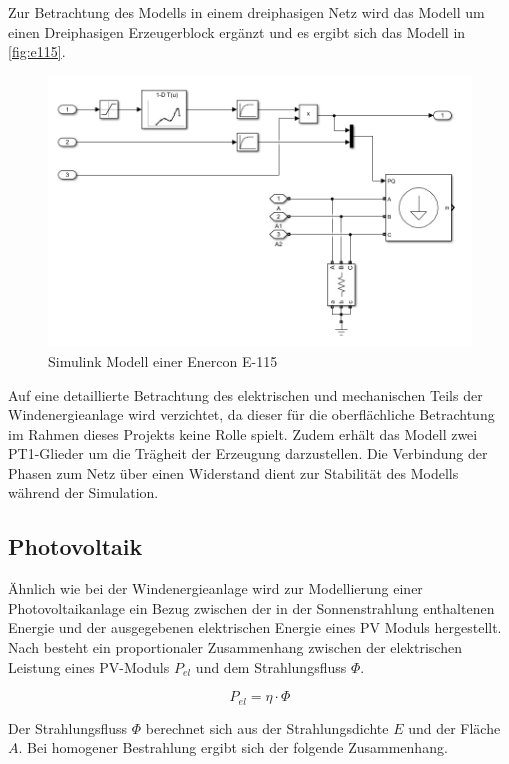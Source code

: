 Zur Betrachtung des Modells in einem dreiphasigen Netz wird das Modell um einen Dreiphasigen Erzeugerblock ergänzt und es ergibt sich das Modell in \autoref{fig:e115}. 

\begin{figure}[H]
	\centering
	\includegraphics[width=0.9\linewidth]{Abbildungen/ModellWEA.png}
	\caption{Simulink Modell einer Enercon E-115}
	\label{fig:e115}
\end{figure}

Auf eine detaillierte Betrachtung des elektrischen und mechanischen Teils der Windenergieanlage wird verzichtet, da dieser für die oberflächliche Betrachtung im Rahmen dieses Projekts keine Rolle spielt. Zudem erhält das Modell zwei PT1-Glieder um die Trägheit der Erzeugung darzustellen. Die Verbindung der Phasen zum Netz über einen Widerstand dient zur Stabilität des Modells während der Simulation.

\subsection{Photovoltaik}

Ähnlich wie bei der Windenergieanlage wird zur Modellierung einer Photovoltaikanlage ein Bezug zwischen der in der Sonnenstrahlung enthaltenen Energie und der ausgegebenen elektrischen Energie eines PV Moduls hergestellt. Nach \cite{PV} besteht ein proportionaler Zusammenhang zwischen der elektrischen Leistung eines PV-Moduls $P_{el}$ und dem Strahlungsfluss $\Phi$. 

\begin{equation}
	P_{el} = \eta \cdot \Phi
\end{equation}

Der Strahlungsfluss $\Phi$ berechnet sich aus der Strahlungsdichte $E$ und der Fläche $A$. Bei homogener Bestrahlung ergibt sich der folgende Zusammenhang.

